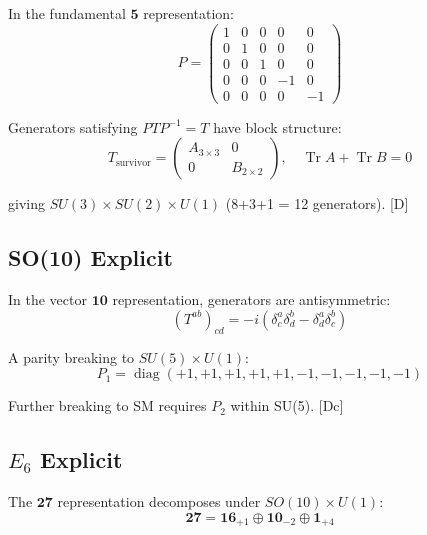 \documentclass[11pt,a4paper]{article}
\newcommand{\tagD}{\textcolor{blue!70!black}{[D]}}
\newcommand{\tagDc}{\textcolor{blue!50!black}{[Dc]}}
\DeclareMathOperator{\Tr}{Tr}
\DeclareMathOperator{\diag}{diag}
\begin{document}
In the fundamental $\mathbf{5}$ representation:
\begin{equation}
\label{eq:su5-P-explicit}
P = \begin{pmatrix}
1 & 0 & 0 & 0 & 0 \\
0 & 1 & 0 & 0 & 0 \\
0 & 0 & 1 & 0 & 0 \\
0 & 0 & 0 & -1 & 0 \\
0 & 0 & 0 & 0 & -1
\end{pmatrix}
\end{equation}

Generators satisfying $P T P^{-1} = T$ have block structure:
\begin{equation}
\label{eq:su5-survivor-block}
T_{\text{survivor}} = \begin{pmatrix}
A_{3\times 3} & 0 \\
0 & B_{2\times 2}
\end{pmatrix}, \quad \Tr A + \Tr B = 0
\end{equation}

giving $SU(3) \times SU(2) \times U(1)$ (8+3+1 = 12 generators). \tagD

\subsection{SO(10) Explicit}

In the vector $\mathbf{10}$ representation, generators are antisymmetric:
\begin{equation}
\label{eq:so10-gen}
(T^{ab})_{cd} = -i(\delta^a_c \delta^b_d - \delta^a_d \delta^b_c)
\end{equation}

A parity breaking to $SU(5) \times U(1)$:
\begin{equation}
\label{eq:so10-P-su5}
P_1 = \diag(+1, +1, +1, +1, +1, -1, -1, -1, -1, -1)
\end{equation}

Further breaking to SM requires $P_2$ within SU(5). \tagDc

\subsection{$E_6$ Explicit}

The $\mathbf{27}$ representation decomposes under $SO(10) \times U(1)$:
\begin{equation}
\label{eq:e6-27}
\mathbf{27} = \mathbf{16}_{+1} \oplus \mathbf{10}_{-2} \oplus \mathbf{1}_{+4}
\end{equation}
\end{document}
